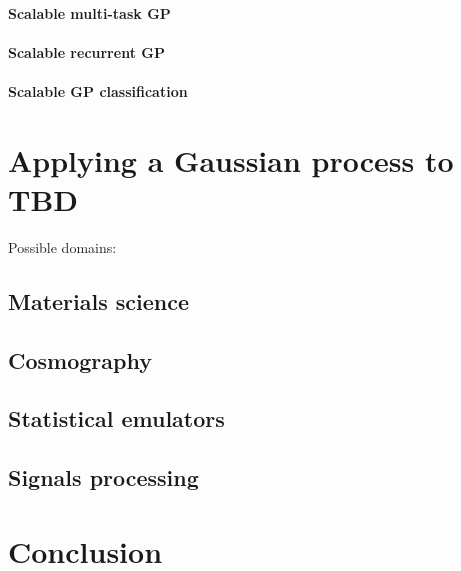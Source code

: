 \documentclass[10pt]{article}
\begin{document}
\paragraph{Scalable multi-task GP}

\paragraph{Scalable recurrent GP}

\paragraph{Scalable GP classification}



\section{Applying a Gaussian process to TBD}
Possible domains:


\subsection{Materials science \cite{materials}}


\subsection{Cosmography \cite{cosmography}}


\subsection{Statistical emulators \cite{emulators}}


\subsection{Signals processing \cite{signals-processing}}



\section{Conclusion}




\printbibliography
\end{document}

